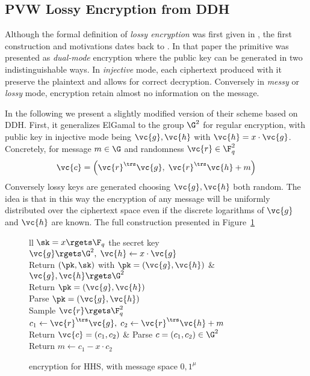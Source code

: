 \subsection{PVW Lossy Encryption from DDH}
Although the formal definition of \textit{lossy encryption} was first given in \cite{AC:HLOV11}, the first construction and motivations dates back to \cite{C:PeiVaiWat08}.
In that paper the primitive was presented as \textit{dual-mode} encryption where the public key can be generated in two indistinguishable ways.
In \textit{injective} mode, each ciphertext produced with it preserve the plaintext and allows for correct decryption.
Conversely in \textit{messy} or \textit{lossy} mode, encryption retain almost no information on the message.

In the following we present a slightly modified version of their scheme based on DDH.
First, it generalizes ElGamal to the group $\G^2$ for regular encryption, with public key in injective mode being $\vc{g}, \vc{h}$ with $\vc{h} = x \cdot \vc{g}$. Concretely, for message $m \in \G$ and randomness $\vc{r} \in \F_q^2$
\[
	\vc{c} = \left( \vc{r}^\trs \vc{g}, \; \vc{r}^\trs \vc{h} + m \right)
\]
Conversely lossy keys are generated choosing $\vc{g}, \vc{h}$ both random.
The idea is that in this way the encryption of any message will be uniformly distributed over the ciphertext space even if the discrete logarithms of $\vc{g}$ and $\vc{h}$ are known.
The full construction presented in Figure~\ref{prot:PVW08}

\begin{figure}[htb]
\centering
\begin{pcarray}{ll}
		{
			$\sk = x \rgets \F_q$ the secret key
				\\
			$\vc{g} \rgets \G^2, \; \vc{h} \gets x \cdot \vc{g}$
				\\
			Return $(\pk, \sk)$ with $\pk = (\vc{g}, \vc{h})$	
		}
	&
		{
			$\vc{g}, \vc{h} \rgets \G^2$
				\\
			Return $\pk = (\vc{g}, \vc{h})$
		}
	\\
		{
			Parse $\pk = (\vc{g}, \vc{h})$
				\\
			Sample $\vc{r} \rgets \F_q^2$
				\\
			$c_1 \gets \vc{r}^\trs \vc{g}, \; c_2 \gets \vc{r}^\trs \vc{h} + m$
				\\
			Return $\vc{c} = (c_1, c_2)$
		}
	&
		{
			Parse $c = (c_1, c_2) \in \G^2$
				\\
			Return $m \gets c_1 - x \cdot c_2$
		}
\end{pcarray}
\label{prot:PVW08}
\caption{\cite{C:PeiVaiWat08} encryption for HHS, with message space ${0, 1}^\mu$}
\end{figure}

